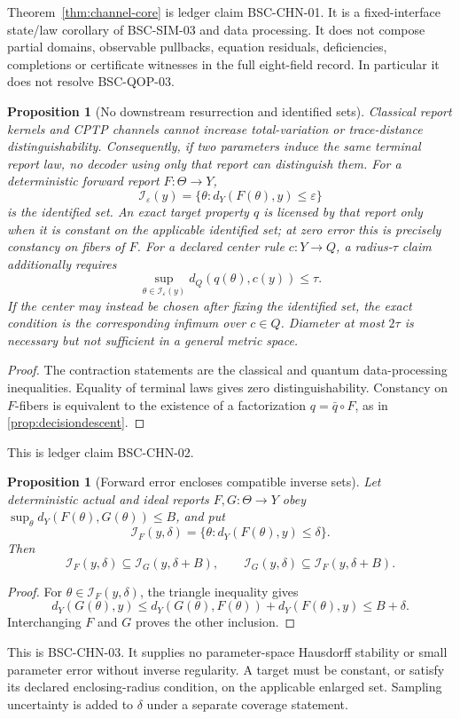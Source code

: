 \documentclass[11pt,a4paper]{article}
\theoremstyle{definition}
\theoremstyle{plain}
\newtheorem{proposition}[definition]{Proposition}
\theoremstyle{remark}
\begin{document}
Theorem~\ref{thm:channel-core} is ledger claim BSC-CHN-01.  It is a
fixed-interface state/law corollary of BSC-SIM-03 and data processing.  It
does not compose partial domains, observable pullbacks, equation residuals,
deficiencies, completions or certificate witnesses in the full eight-field
record.  In particular it does not resolve BSC-QOP-03.

\begin{proposition}[No downstream resurrection and identified sets]
\label{prop:no-resurrection}
Classical report kernels and CPTP channels cannot increase total-variation or
trace-distance distinguishability.  Consequently, if two parameters induce
the same terminal report law, no decoder using only that report can
distinguish them.  For a deterministic forward report \(F:\Theta\to Y\),
\[
\mathcal I_\varepsilon(y)
=
\{\theta:d_Y(F(\theta),y)\le\varepsilon\}
\]
is the identified set.  An exact target property \(q\) is licensed by that
report only when it is constant on the applicable identified set; at zero
error this is precisely constancy on fibers of \(F\).  For a declared center
rule \(c:Y\to Q\), a radius-\(\tau\) claim additionally requires
\[
\sup_{\theta\in\mathcal I_\varepsilon(y)}
d_Q(q(\theta),c(y))\le\tau.
\]
If the center may instead be chosen after fixing the identified set, the
exact condition is the corresponding infimum over \(c\in Q\).  Diameter at
most \(2\tau\) is necessary but not sufficient in a general metric space.
\end{proposition}
\begin{proof}
The contraction statements are the classical and quantum data-processing
inequalities.  Equality of terminal laws gives zero distinguishability.
Constancy on \(F\)-fibers is equivalent to the existence of a factorization
\(q=\bar q\circ F\), as in \cref{prop:decisiondescent}.
\end{proof}
This is ledger claim BSC-CHN-02.

\begin{proposition}[Forward error encloses compatible inverse sets]
\label{prop:inverse-enclosure}
Let deterministic actual and ideal reports \(F,G:\Theta\to Y\) obey
\(\sup_\theta d_Y(F(\theta),G(\theta))\le B\), and put
\[
\mathcal I_F(y,\delta)=\{\theta:d_Y(F(\theta),y)\le\delta\}.
\]
Then
\[
\boxed{
\mathcal I_F(y,\delta)\subseteq\mathcal I_G(y,\delta+B),
\qquad
\mathcal I_G(y,\delta)\subseteq\mathcal I_F(y,\delta+B)
}.
\]
\end{proposition}
\begin{proof}
For \(\theta\in\mathcal I_F(y,\delta)\), the triangle inequality gives
\[
d_Y(G(\theta),y)
\le d_Y(G(\theta),F(\theta))+d_Y(F(\theta),y)
\le B+\delta.
\]
Interchanging \(F\) and \(G\) proves the other inclusion.
\end{proof}
This is BSC-CHN-03.  It supplies no parameter-space Hausdorff stability or
small parameter error without inverse regularity.  A target must be constant,
or satisfy its declared enclosing-radius condition, on the applicable
enlarged set.  Sampling uncertainty is added to \(\delta\) under a separate
coverage statement.
\end{document}
